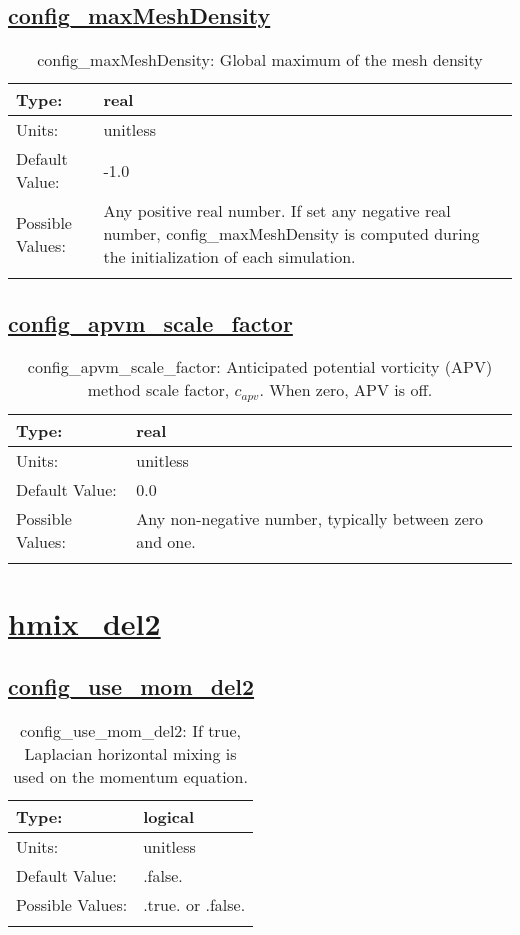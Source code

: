 \subsection[config\_maxMeshDensity]{\hyperref[sec:nm_tab_hmix]{config\_maxMeshDensity}}
\label{subsec:nm_sec_config_maxMeshDensity}
\begin{center}
\begin{longtable}{| p{2.0in} || p{4.0in} |}
    \hline
    Type: & real \\
    \hline
    Units: & \si{unitless} \\
    \hline
    Default Value: & -1.0 \\
    \hline
    Possible Values: & Any positive real number. If set any negative real number, config\_maxMeshDensity is computed during the initialization of each simulation. \\
    \hline
    \caption{config\_maxMeshDensity: Global maximum of the mesh density}
\end{longtable}
\end{center}
\subsection[config\_apvm\_scale\_factor]{\hyperref[sec:nm_tab_hmix]{config\_apvm\_scale\_factor}}
\label{subsec:nm_sec_config_apvm_scale_factor}
\begin{center}
\begin{longtable}{| p{2.0in} || p{4.0in} |}
    \hline
    Type: & real \\
    \hline
    Units: & \si{unitless} \\
    \hline
    Default Value: & 0.0 \\
    \hline
    Possible Values: & Any non-negative number, typically between zero and one. \\
    \hline
    \caption{config\_apvm\_scale\_factor: Anticipated potential vorticity (APV) method scale factor, $c_{apv}$. When zero, APV is off.}
\end{longtable}
\end{center}
\section[hmix\_del2]{\hyperref[sec:nm_tab_hmix_del2]{hmix\_del2}}
\label{sec:nm_sec_hmix_del2}
\subsection[config\_use\_mom\_del2]{\hyperref[sec:nm_tab_hmix_del2]{config\_use\_mom\_del2}}
\label{subsec:nm_sec_config_use_mom_del2}
\begin{center}
\begin{longtable}{| p{2.0in} || p{4.0in} |}
    \hline
    Type: & logical \\
    \hline
    Units: & \si{unitless} \\
    \hline
    Default Value: & .false. \\
    \hline
    Possible Values: & .true. or .false. \\
    \hline
    \caption{config\_use\_mom\_del2: If true, Laplacian horizontal mixing is used on the momentum equation.}
\end{longtable}
\end{center}
